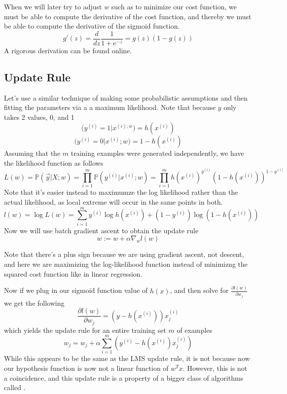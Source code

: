 \documentclass[12pt]{scrartcl}
\begin{document}
\begin{lemma}
    When we will later try to adjust $w$ such as to 
    minimize our cost function, we must be able to compute the 
    derivative of the cost function, and thereby we must be able 
    to compute the derivative of the sigmoid function.
    \[g'(z) = \frac{d}{dz}\frac{1}{1 + e^{-z}}
    = g(z)(1-g(z))\]
    A rigorous derivation can be found online.
\end{lemma}

\subsection{Update Rule}

Let's use a similar technique of making some 
probabilistic assumptions and then fitting the parameters via a
a maximum likelihood. Note that because $y$ only takes
2 values, 0, and 1
\[\mathbb(y^{(i)} = 1 | x^{(i); w}) = h(x^{(i)})\]
\[\mathbb(y^{(i)} = 0 | x^{(i)}; w) = 1 - h(x^{(i)})\]
Assuming that the $m$ training examples were 
generated independently, we have the likelihood function
as follows
\[L(w) = \mathbb{P}(\vec{y} | X; w) = \prod_{i=1}^m\mathbb{P}(y^{(i)} | x^{(i)}; w)
= \prod_{i=1}^m h(x^{(i)})^{y^{(i)}}(1-h(x^{(i)}))^{1-y^{(i)}}\]
Note that it's easier instead to maximumze the log likelihood 
rather than the actual likelihood, as local extreme will occur in the same 
points in both.
\[l(w) = \log L(w) = \sum_{i=1}^my^{(i)}\log h(x^{(i)}) + (1-y^{(i)})\log(1-h(x^{(i)}))\]
Now we will use batch gradient ascent to obtain the update rule
\[w:= w + \alpha \nabla_wl(w)\]
\begin{note}
    Note that there's a plus sign because we are using
    gradient ascent, not descent, and here we are maximizing the 
    log-likelihood function instead of minimizng the 
    squared cost function like in linear regression.
\end{note}
Now if we plug in our sigmoid function value of $h(x)$, and then solve for 
$\frac{\partial l(w)}{\partial w_j}$ we get the following 
\[\frac{\partial l(w)}{\partial w_j} = (y-h(x^{(i)}))x_j^{(i)}\]
which yields the update rule for an entire training set $m$ of examples
\[w_j = w_j + \alpha \sum_{i=1}^m (y^{(i)} - h(x^{(i)})x_j^{(i)})\]
While this appears to be the same as the LMS update rule, it is not because 
now our hypothesis function is now not a linear function of $w^Tx$. However, this is not a
coincidence, and this update rule is a  property of a bigger class of algorithms called
.
\end{document}
